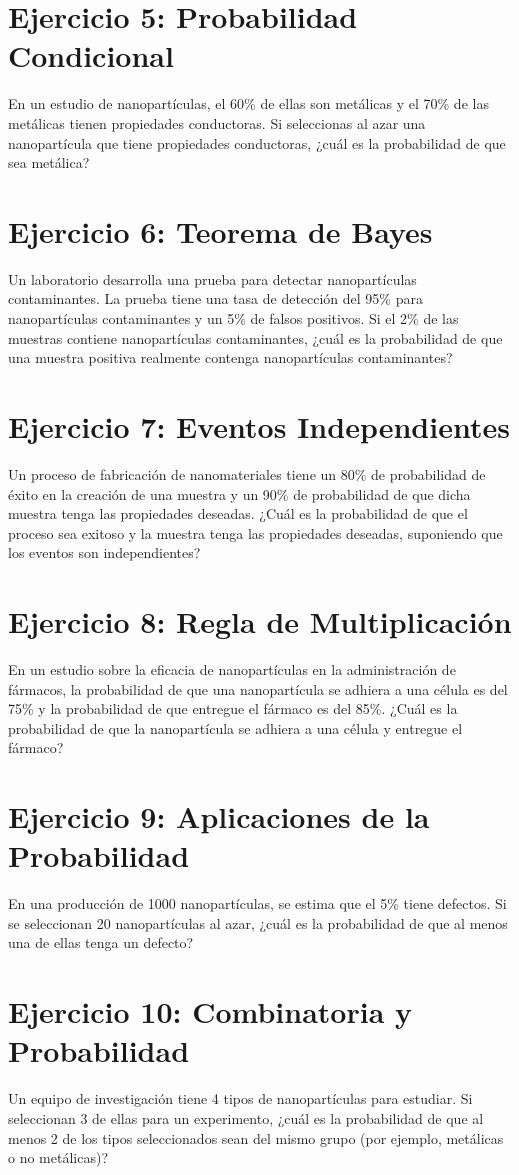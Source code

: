 \documentclass[a4paper,openright,10pt]{article}
\begin{document}
\section*{Ejercicio 5: Probabilidad Condicional}
En un estudio de nanopartículas, el 60\% de ellas son metálicas y el 70\% de las metálicas tienen propiedades conductoras. Si seleccionas al azar una nanopartícula que tiene propiedades conductoras, ¿cuál es la probabilidad de que sea metálica?

\section*{Ejercicio 6: Teorema de Bayes}
Un laboratorio desarrolla una prueba para detectar nanopartículas contaminantes. La prueba tiene una tasa de detección del 95\% para nanopartículas contaminantes y un 5\% de falsos positivos. Si el 2\% de las muestras contiene nanopartículas contaminantes, ¿cuál es la probabilidad de que una muestra positiva realmente contenga nanopartículas contaminantes?

\section*{Ejercicio 7: Eventos Independientes}
Un proceso de fabricación de nanomateriales tiene un 80\% de probabilidad de éxito en la creación de una muestra y un 90\% de probabilidad de que dicha muestra tenga las propiedades deseadas. ¿Cuál es la probabilidad de que el proceso sea exitoso y la muestra tenga las propiedades deseadas, suponiendo que los eventos son independientes?

\section*{Ejercicio 8: Regla de Multiplicación}
En un estudio sobre la eficacia de nanopartículas en la administración de fármacos, la probabilidad de que una nanopartícula se adhiera a una célula es del 75\% y la probabilidad de que entregue el fármaco es del 85\%. ¿Cuál es la probabilidad de que la nanopartícula se adhiera a una célula y entregue el fármaco?

\section*{Ejercicio 9: Aplicaciones de la Probabilidad}
En una producción de 1000 nanopartículas, se estima que el 5\% tiene defectos. Si se seleccionan 20 nanopartículas al azar, ¿cuál es la probabilidad de que al menos una de ellas tenga un defecto?

\section*{Ejercicio 10: Combinatoria y Probabilidad}
Un equipo de investigación tiene 4 tipos de nanopartículas para estudiar. Si seleccionan 3 de ellas para un experimento, ¿cuál es la probabilidad de que al menos 2 de los tipos seleccionados sean del mismo grupo (por ejemplo, metálicas o no metálicas)?
\end{document}
